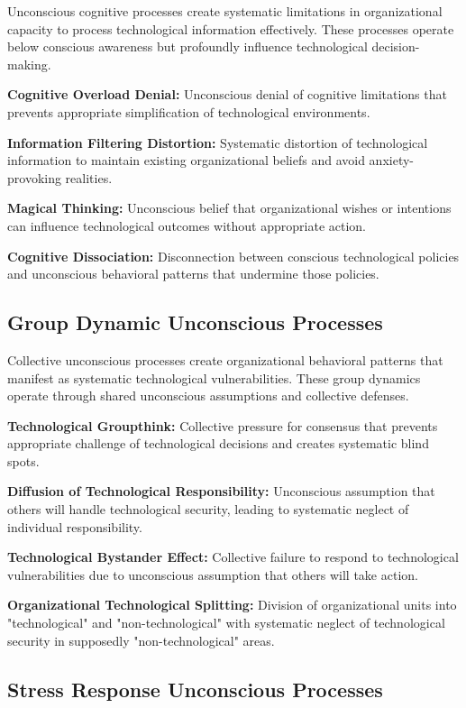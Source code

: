 \documentclass[10pt, twocolumn]{article}
\begin{document}
Unconscious cognitive processes create systematic limitations in organizational capacity to process technological information effectively. These processes operate below conscious awareness but profoundly influence technological decision-making.

\textbf{Cognitive Overload Denial:} Unconscious denial of cognitive limitations that prevents appropriate simplification of technological environments.

\textbf{Information Filtering Distortion:} Systematic distortion of technological information to maintain existing organizational beliefs and avoid anxiety-provoking realities.

\textbf{Magical Thinking:} Unconscious belief that organizational wishes or intentions can influence technological outcomes without appropriate action.

\textbf{Cognitive Dissociation:} Disconnection between conscious technological policies and unconscious behavioral patterns that undermine those policies.

\subsection{Group Dynamic Unconscious Processes}

Collective unconscious processes create organizational behavioral patterns that manifest as systematic technological vulnerabilities. These group dynamics operate through shared unconscious assumptions and collective defenses.

\textbf{Technological Groupthink:} Collective pressure for consensus that prevents appropriate challenge of technological decisions and creates systematic blind spots.

\textbf{Diffusion of Technological Responsibility:} Unconscious assumption that others will handle technological security, leading to systematic neglect of individual responsibility.

\textbf{Technological Bystander Effect:} Collective failure to respond to technological vulnerabilities due to unconscious assumption that others will take action.

\textbf{Organizational Technological Splitting:} Division of organizational units into "technological" and "non-technological" with systematic neglect of technological security in supposedly "non-technological" areas.

\subsection{Stress Response Unconscious Processes}
\end{document}
